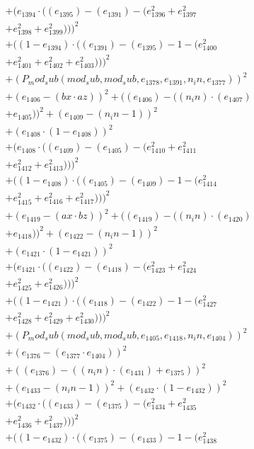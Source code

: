 \documentclass[10pt, a4paper]{article}
\begin{document}
\begin{align*}
& + (e_{1394}  \cdot  ((e_{1395}) - (e_{1391}) - (e_{1396}^{2} + e_{1397}^{2} \\
& + e_{1398}^{2} + e_{1399}^{2})))^{2} \\
& + ((1 - e_{1394})  \cdot  ((e_{1391}) - (e_{1395}) - 1 - (e_{1400}^{2} \\
& + e_{1401}^{2} + e_{1402}^{2} + e_{1403}^{2})))^{2} \\
& + (P_mod_sub(mod_sub, mod_sub, e_{1378}, e_{1391}, n_in, e_{1377}))^{2} \\
& + (e_{1406} - (bx  \cdot  az))^{2} + ((e_{1406}) - ((n_in)  \cdot  (e_{1407}) \\
& + e_{1405}))^{2} + (e_{1409} - (n_in - 1))^{2} \\
& + (e_{1408}  \cdot  (1 - e_{1408}))^{2} \\
& + (e_{1408}  \cdot  ((e_{1409}) - (e_{1405}) - (e_{1410}^{2} + e_{1411}^{2} \\
& + e_{1412}^{2} + e_{1413}^{2})))^{2} \\
& + ((1 - e_{1408})  \cdot  ((e_{1405}) - (e_{1409}) - 1 - (e_{1414}^{2} \\
& + e_{1415}^{2} + e_{1416}^{2} + e_{1417}^{2})))^{2} \\
& + (e_{1419} - (ax  \cdot  bz))^{2} + ((e_{1419}) - ((n_in)  \cdot  (e_{1420}) \\
& + e_{1418}))^{2} + (e_{1422} - (n_in - 1))^{2} \\
& + (e_{1421}  \cdot  (1 - e_{1421}))^{2} \\
& + (e_{1421}  \cdot  ((e_{1422}) - (e_{1418}) - (e_{1423}^{2} + e_{1424}^{2} \\
& + e_{1425}^{2} + e_{1426}^{2})))^{2} \\
& + ((1 - e_{1421})  \cdot  ((e_{1418}) - (e_{1422}) - 1 - (e_{1427}^{2} \\
& + e_{1428}^{2} + e_{1429}^{2} + e_{1430}^{2})))^{2} \\
& + (P_mod_sub(mod_sub, mod_sub, e_{1405}, e_{1418}, n_in, e_{1404}))^{2} \\
& + (e_{1376} - (e_{1377}  \cdot  e_{1404}))^{2} \\
& + ((e_{1376}) - ((n_in)  \cdot  (e_{1431}) + e_{1375}))^{2} \\
& + (e_{1433} - (n_in - 1))^{2} + (e_{1432}  \cdot  (1 - e_{1432}))^{2} \\
& + (e_{1432}  \cdot  ((e_{1433}) - (e_{1375}) - (e_{1434}^{2} + e_{1435}^{2} \\
& + e_{1436}^{2} + e_{1437}^{2})))^{2} \\
& + ((1 - e_{1432})  \cdot  ((e_{1375}) - (e_{1433}) - 1 - (e_{1438}^{2} \\

\end{align*}
\end{document}
